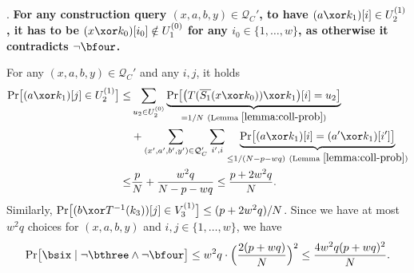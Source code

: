 %



\arrangespace

\noindent \textsc{\bfour}. \textbf{For any construction query $(x,a,b,y)\in\mathcal{Q}_C'$, to have $(a\xor k_1)[i]\in U_2^{(1)}$, it has to be $(x\xor k_0)[i_0]\notin U_1^{(0)}$ for any $i_0\in\{1,\ldots,w\}$, as otherwise it contradicts $\neg\bfour$.}


For any $(x,a,b,y)\in\mathcal{Q}_C'$ and any $i,j$, it holds
%
\begin{align}
{\Pr}\big[(a\xor k_1)[j]\in U_2^{(1)}\big] \leq  &  \sum_{u_2\in U_2^{(0)}}  \underbrace{{\Pr}\big[\big(T(\overline{S_1}(x\xor k_0))\xor k_1\big)[i]=u_2\big]}_{=1/N\ (\text{Lemma }\ref{lemma:coll-prob})}       \notag        \\
& +
\sum_{(x',a',b',y')\in\mathcal{Q}_C'}\sum_{i',i} \underbrace{{\Pr}\big[(a\xor k_1)[i]=(a'\xor k_1)[i']\big]}_{\leq1/(N-p-wq)\ (\text{Lemma }\ref{lemma:coll-prob})}         \notag      \\
\leq  &  \frac{p}{N}+\frac{w^2q}{N-p-wq} \leq \frac{p+2w^2q}{N}.
\notag
\end{align}
Similarly, ${\Pr}\big[(b\xor T^{-1}(k_3))[j]\in V_3^{(1)}\big]\leq(p+2w^2q)/N$. Since we have at most $w^2q$ choices for $(x,a,b,y)$ and $i, j \in\{1, \ldots, w\}$, we have
%
$$
{\Pr}\big[\bsix\mid\neg\bthree\wedge\neg\bfour\big] \leq
w^2q\cdot\Big(\frac{2(p+wq)}{N}\Big)^2\leq \frac{4w^2q(p+wq)^2}{N}.
$$


